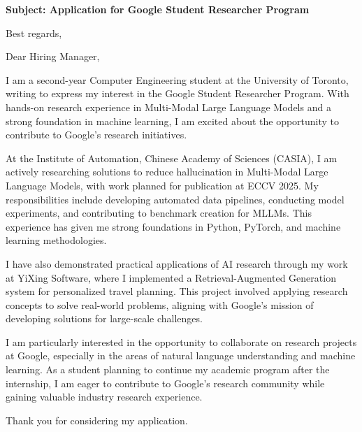 \documentclass[11pt,a4paper,roman]{moderncv}
\begin{document}
\date{\today}
\opening{\textbf{Subject: Application for Google Student Researcher Program}}
\closing{Best regards,}

\makelettertitle

Dear Hiring Manager,

I am a second-year Computer Engineering student at the University of Toronto, writing to express my interest in the Google Student Researcher Program. With hands-on research experience in Multi-Modal Large Language Models and a strong foundation in machine learning, I am excited about the opportunity to contribute to Google's research initiatives.

At the Institute of Automation, Chinese Academy of Sciences (CASIA), I am actively researching solutions to reduce hallucination in Multi-Modal Large Language Models, with work planned for publication at ECCV 2025. My responsibilities include developing automated data pipelines, conducting model experiments, and contributing to benchmark creation for MLLMs. This experience has given me strong foundations in Python, PyTorch, and machine learning methodologies.

I have also demonstrated practical applications of AI research through my work at YiXing Software, where I implemented a Retrieval-Augmented Generation system for personalized travel planning. This project involved applying research concepts to solve real-world problems, aligning with Google's mission of developing solutions for large-scale challenges.

I am particularly interested in the opportunity to collaborate on research projects at Google, especially in the areas of natural language understanding and machine learning. As a student planning to continue my academic program after the internship, I am eager to contribute to Google's research community while gaining valuable industry research experience.

Thank you for considering my application.

\makeletterclosing
\end{document}
